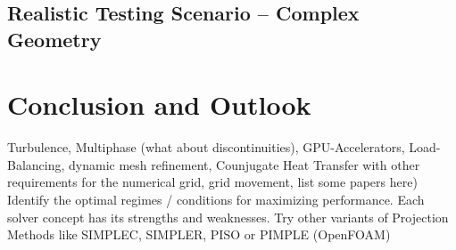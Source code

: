\documentclass[article,type=msc,colorback,accentcolor=tud2a]{tudthesis}
\begin{document}
    \subsection{Realistic Testing Scenario -- Complex Geometry}
        
  \section{Conclusion and Outlook}
    Turbulence, Multiphase (what about discontinuities), GPU-Accelerators, Load-Balancing, dynamic mesh refinement, Counjugate Heat Transfer with other requirements for the numerical grid, grid movement, list some papers here)
    Identify the optimal regimes / conditions for maximizing performance. Each solver concept has its strengths and weaknesses.
    Try other variants of Projection Methods like SIMPLEC, SIMPLER, PISO or PIMPLE (OpenFOAM)
\end{document}
